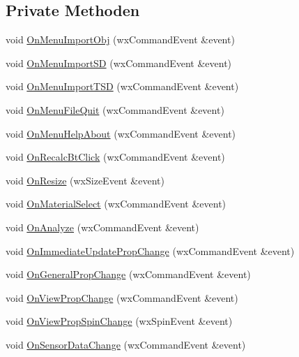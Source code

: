\subsection*{Private Methoden}
\begin{DoxyCompactItemize}
\item 
void \hyperlink{classGUIMainWindow_a9fd9f2be8f45cb5433193f5d28c924bc}{On\-Menu\-Import\-Obj} (wx\-Command\-Event \&event)
\item 
void \hyperlink{classGUIMainWindow_a405b99746fe6f35ec527c57604e53ce2}{On\-Menu\-Import\-S\-D} (wx\-Command\-Event \&event)
\item 
void \hyperlink{classGUIMainWindow_ab6b1fb242c4b529764093a092349f560}{On\-Menu\-Import\-T\-S\-D} (wx\-Command\-Event \&event)
\item 
void \hyperlink{classGUIMainWindow_a594fc9fea2ef8cc4febc3c48c0e260c4}{On\-Menu\-File\-Quit} (wx\-Command\-Event \&event)
\item 
void \hyperlink{classGUIMainWindow_acefa13614ee8e5fc228fc577b7471b26}{On\-Menu\-Help\-About} (wx\-Command\-Event \&event)
\item 
void \hyperlink{classGUIMainWindow_a0c2de30274c7f52ff74ec1217e47a9e5}{On\-Recalc\-Bt\-Click} (wx\-Command\-Event \&event)
\item 
void \hyperlink{classGUIMainWindow_a3a8bcd318ff00de01d8d417cf5226120}{On\-Resize} (wx\-Size\-Event \&event)
\item 
void \hyperlink{classGUIMainWindow_a6618f0cc7d26ba7690c32a996f0b812e}{On\-Material\-Select} (wx\-Command\-Event \&event)
\item 
void \hyperlink{classGUIMainWindow_ac76ba4dd3d1175d66c1b13369ec26a69}{On\-Analyze} (wx\-Command\-Event \&event)
\item 
void \hyperlink{classGUIMainWindow_ae0b6c47ae833ea4b8323e9c344b1f70a}{On\-Immediate\-Update\-Prop\-Change} (wx\-Command\-Event \&event)
\item 
void \hyperlink{classGUIMainWindow_a0eb68f1e4a740486706f98eeca783a68}{On\-General\-Prop\-Change} (wx\-Command\-Event \&event)
\item 
void \hyperlink{classGUIMainWindow_ada2a98f493fcdcbdc7bd6acb47d51218}{On\-View\-Prop\-Change} (wx\-Command\-Event \&event)
\item 
void \hyperlink{classGUIMainWindow_a9d642647d7cb73e34ef88c76438206a7}{On\-View\-Prop\-Spin\-Change} (wx\-Spin\-Event \&event)
\item 
void \hyperlink{classGUIMainWindow_a98249bb199993ad5920cf81f4b4a350a}{On\-Sensor\-Data\-Change} (wx\-Command\-Event \&event)

\end{DoxyCompactItemize}
